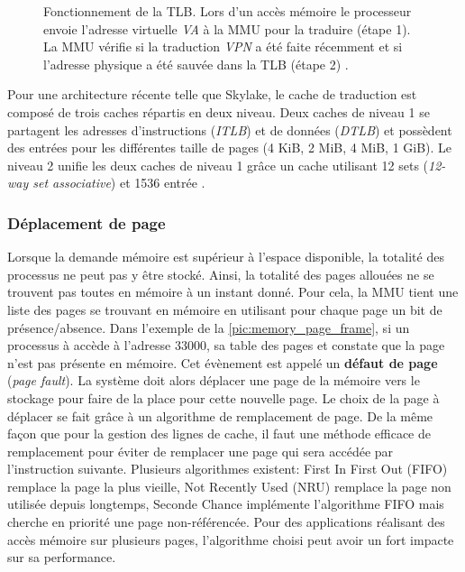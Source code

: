\begin{figure}
\begin{subfigure}[t]{0.48\linewidth}
        \label{pic_memory_page_table_tlb_miss}
    \end{subfigure}
    \caption{Fonctionnement de la TLB. Lors d'un accès mémoire le processeur envoie l'adresse virtuelle \textit{VA} à la MMU pour la traduire (étape 1). La MMU vérifie si la traduction \textit{VPN} a été faite récemment et si l'adresse physique a été sauvée dans la TLB (étape 2) \cite{Mowry2012}.
    \label{pic_memory_page_table_tlb}}
\end{figure}




Pour une architecture récente telle que Skylake, le cache de traduction est composé de trois caches répartis en deux niveau. Deux caches de niveau 1 se partagent les adresses d'instructions (\textit{ITLB}) et de données (\textit{DTLB}) et possèdent des entrées pour les différentes taille de pages (4 KiB, 2 MiB, 4 MiB, 1 GiB). Le niveau 2 unifie les deux caches de niveau 1 grâce un cache utilisant 12 sets  (\textit{12-way set associative}) et 1536 entrée \cite{Wikichipb}.




\subsubsection{Déplacement de page} \label{sec:deplacement_page}
Lorsque la demande mémoire est supérieur à l'espace disponible, la totalité des processus ne peut pas y être stocké. Ainsi, la totalité des pages allouées ne se trouvent pas toutes en mémoire à un instant donné. Pour cela, la MMU tient une liste des pages se trouvant en mémoire en utilisant pour chaque page un bit de présence/absence. Dans l'exemple de la \autoref{pic:memory_page_frame}, si un processus à accède à l'adresse $33000$, sa table des pages et constate que la page n'est pas présente en mémoire. Cet évènement est appelé un \textbf{défaut de page} (\textit{page fault}). La système doit alors déplacer une page de la mémoire vers le stockage pour faire de la place pour cette nouvelle page. Le choix de la page à déplacer se fait grâce à un algorithme de remplacement de page. De la même façon que pour la gestion des lignes de cache, il faut une méthode efficace de remplacement pour éviter de remplacer une page qui sera accédée par l'instruction suivante. Plusieurs algorithmes existent: First In First Out (FIFO) remplace la page la plus vieille, Not Recently Used (NRU) remplace la page non utilisée depuis longtemps, Seconde Chance implémente l'algorithme FIFO mais cherche en priorité une page non-référencée. Pour des applications réalisant des accès mémoire sur plusieurs pages, l'algorithme choisi peut avoir un fort impacte sur sa performance.




